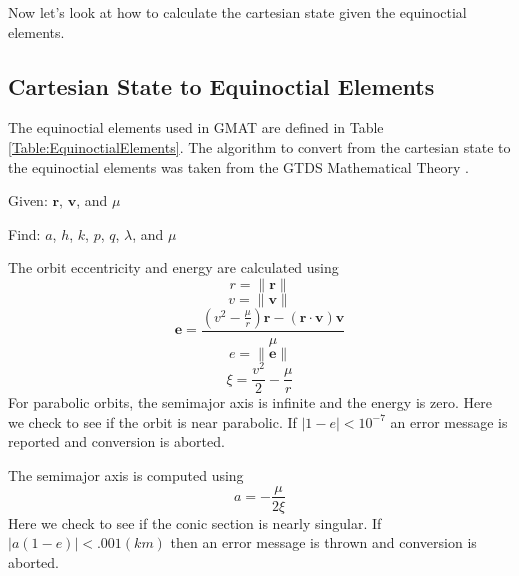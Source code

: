 Now let's look at how to calculate the cartesian state given the
equinoctial elements.

\subsection{Cartesian State to Equinoctial Elements}  
\label{Sec:CartesiantoEquinoctial}

The equinoctial elements used in GMAT are defined in Table
\ref{Table:EquinoctialElements}.  The algorithm to convert from
the cartesian state to the equinoctial elements was taken from the
GTDS Mathematical Theory \cite{GTDS}.

\noindent Given:  $\mathbf{r}$, $\mathbf{v}$, and $\mu$

\noindent Find:  $a$, $h$, $k$, $p$, $q$, $\lambda$, and $\mu$

The orbit eccentricity and energy are calculated using
%
\begin{equation}
    r = \| \mathbf{r} \|
\end{equation}
%
\begin{equation}
    v = \| \mathbf{v} \|
\end{equation}
%
\begin{equation}
     \mathbf{e} = \displaystyle\frac{(v^2 - \displaystyle\frac{\mu}{r} )\mathbf{r} - (\mathbf{r}\cdot\mathbf{v}  )\mathbf{v}}{\mu}
\end{equation}
%
\begin{equation}
     e = \| \mathbf{e} \|
\end{equation}
%
\begin{equation}
     \xi = \frac{v^2}{2} - \frac{\mu}{r}
\end{equation}
%
For parabolic orbits, the semimajor axis is infinite
and the energy is zero. Here we check to see if the orbit is near
parabolic.  If $|1 - e| < 10^{-7}$ an error message is reported
and conversion is aborted.

The semimajor axis is computed using
%
\begin{equation}
     a = -\frac{\mu}{2\xi}
\end{equation}
%
Here we check to see if the conic section is nearly singular.
If $|a(1-e)| < .001 (km)$ then an error message is thrown and conversion is aborted.

